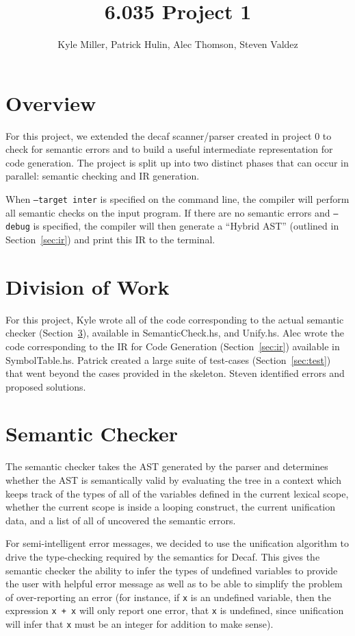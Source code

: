 \documentclass[11pt]{article}
\title{6.035 Project 1}
\author{Kyle Miller, Patrick Hulin, Alec Thomson, Steven Valdez}
\begin{document}
\maketitle

\section{Overview} 

For this project, we extended the decaf scanner/parser created in project 0 to check for semantic errors and to build a useful intermediate representation for code generation. The project is split up into two distinct phases that can occur in parallel: semantic checking and IR generation. 

When \texttt{--target inter} is specified on the command line, the compiler will perform all semantic checks on the input program. If there are no semantic errors and \texttt{--debug} is specified, the compiler will then generate a ``Hybrid AST'' (outlined in Section~\ref{sec:ir}) and print this IR to the terminal. 

\section{Division of Work} 

For this project, Kyle wrote all of the code corresponding to the
actual semantic checker (Section~\ref{sec:checker}), available in
SemanticCheck.hs, and Unify.hs. Alec wrote the code corresponding to
the IR for Code Generation (Section~\ref{sec:ir}) available in
SymbolTable.hs. Patrick created a large suite of test-cases
(Section~\ref{sec:test}) that went beyond the cases provided in the
skeleton. Steven identified errors and proposed solutions. 

\section{Semantic Checker}
\label{sec:checker}

The semantic checker takes the AST generated by the parser and
determines whether the AST is semantically valid by evaluating the
tree in a context which keeps track of the types of all of the
variables defined in the current lexical scope, whether the current
scope is inside a looping construct, the current unification data, and
a list of all of uncovered the semantic errors.

For semi-intelligent error messages, we decided to use the unification
algorithm to drive the type-checking required by the semantics for
Decaf.  This gives the semantic checker the ability to infer the types
of undefined variables to provide the user with helpful error message
as well as to be able to simplify the problem of over-reporting an
error (for instance, if \texttt{x} is an undefined variable, then the
expression \texttt{x + x} will only report one error, that \texttt{x}
is undefined, since unification will infer that \texttt{x} must be an
integer for addition to make sense).
\end{document}
